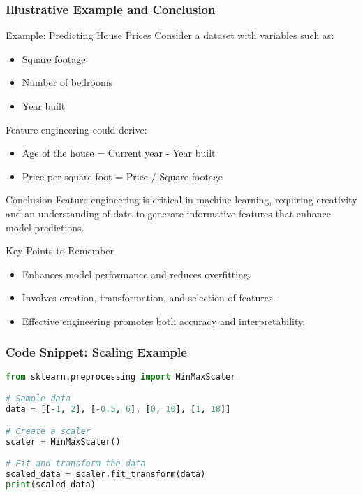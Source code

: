 \documentclass[aspectratio=169]{beamer}
\begin{document}
\begin{frame}[fragile]
    \frametitle{Illustrative Example and Conclusion}
    \begin{block}{Example: Predicting House Prices}
        Consider a dataset with variables such as:
        \begin{itemize}
            \item Square footage
            \item Number of bedrooms
            \item Year built
        \end{itemize}
        Feature engineering could derive:
        \begin{itemize}
            \item Age of the house = Current year - Year built
            \item Price per square foot = Price / Square footage
        \end{itemize}
    \end{block}

    \begin{block}{Conclusion}
        Feature engineering is critical in machine learning, requiring creativity and an understanding of data to generate informative features that enhance model predictions.
    \end{block}

    \begin{block}{Key Points to Remember}
        \begin{itemize}
            \item Enhances model performance and reduces overfitting.
            \item Involves creation, transformation, and selection of features.
            \item Effective engineering promotes both accuracy and interpretability.
        \end{itemize}
    \end{block}
\end{frame}

\begin{frame}[fragile]
    \frametitle{Code Snippet: Scaling Example}
    \begin{lstlisting}[language=Python]
from sklearn.preprocessing import MinMaxScaler

# Sample data
data = [[-1, 2], [-0.5, 6], [0, 10], [1, 18]]

# Create a scaler
scaler = MinMaxScaler()

# Fit and transform the data
scaled_data = scaler.fit_transform(data)
print(scaled_data)
    \end{lstlisting}
\end{frame}
\end{document}
